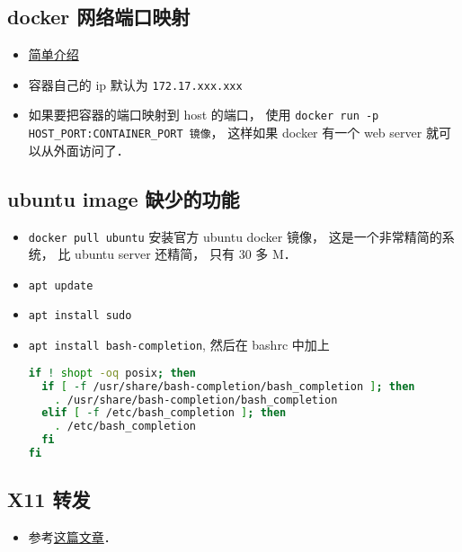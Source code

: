 \subsection{docker 网络端口映射}
\begin{itemize}
\item \href{https://www.freecodecamp.org/news/how-to-get-a-docker-container-ip-address-explained-with-examples/}{简单介绍}
\item 容器自己的 ip 默认为 \verb`172.17.xxx.xxx`
\item 如果要把容器的端口映射到 host 的端口， 使用 \verb`docker run -p HOST_PORT:CONTAINER_PORT 镜像`， 这样如果 docker 有一个 web server 就可以从外面访问了．
\end{itemize}

\subsection{ubuntu image 缺少的功能}
\begin{itemize}
\item \verb|docker pull ubuntu| 安装官方 ubuntu docker 镜像， 这是一个非常精简的系统， 比 ubuntu server 还精简， 只有 30 多 M．
\item \verb|apt update|
\item \verb`apt install sudo`
\item \verb`apt install bash-completion`, 然后在 bashrc 中加上
\begin{lstlisting}[language=bash]
if ! shopt -oq posix; then
  if [ -f /usr/share/bash-completion/bash_completion ]; then
    . /usr/share/bash-completion/bash_completion
  elif [ -f /etc/bash_completion ]; then
    . /etc/bash_completion
  fi
fi
\end{lstlisting}
\end{itemize}

\subsection{X11 转发}
\begin{itemize}
\item 参考\href{https://opendata-forum.cern.ch/t/x11-forwarding-with-docker/31}{这篇文章}．
\end{itemize}
